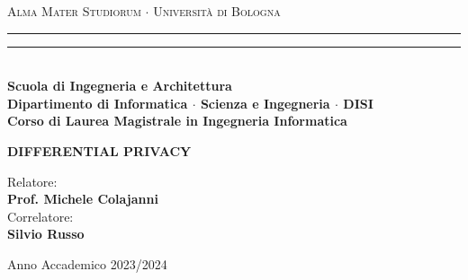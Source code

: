 \begin{titlepage}
    \begin{center}
        {{\Large{\textsc{Alma Mater Studiorum $\cdot$ Universit\`a di Bologna}}}}
        \rule[0.1cm]{15cm}{0.1mm}
        \rule[0.5cm]{15cm}{0.6mm}
        \\\vspace{3mm}
        {\small{\bf Scuola di Ingegneria e Architettura \\
                Dipartimento di Informatica $\cdot$ Scienza e Ingegneria $\cdot$ DISI\\
                Corso di Laurea Magistrale in Ingegneria Informatica}}
    \end{center}

    \vspace{23mm}

    \begin{center}{
            \large \bf DIFFERENTIAL PRIVACY\par
        }\end{center}
    \vspace{40mm} \par \noindent
    \begin{minipage}[t]{0.47\textwidth}{
        \large{Relatore:
        \vspace{2mm}\\
        {\bf Prof. Michele Colajanni}
        }
        \vspace{4mm}\\
        \large{Correlatore:
        \vspace{2mm}\\
        {\bf Silvio Russo}
        }
    }
    \end{minipage}
    \hfill
    \begin{minipage}[t]{0.47\textwidth}
    \end{minipage}
    \vspace{40mm}
    \begin{center}
        Anno Accademico 2023/2024
    \end{center}
\end{titlepage}